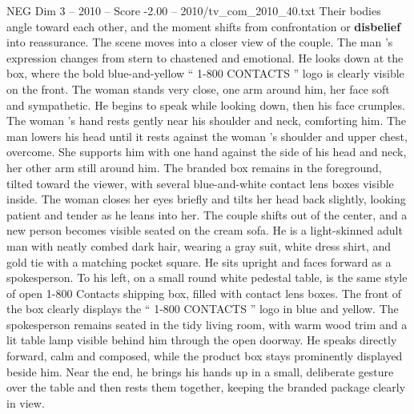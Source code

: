 \begin{textsample}{NEG Dim 3 – 2010 – Score -2.00 – 2010/tv\_com\_2010\_40.txt}
Their bodies angle toward each other, and the moment shifts from confrontation or \textbf{disbelief} into reassurance.
The scene moves into a closer view of the couple.
The man ’s expression changes from stern to chastened and emotional.
He looks down at the box, where the bold blue-and-yellow “ 1-800 CONTACTS ” logo is clearly visible on the front.
The woman stands very close, one arm around him, her face soft and sympathetic.
He begins to speak while looking down, then his face crumples.
The woman ’s hand rests gently near his shoulder and neck, comforting him.
The man lowers his head until it rests against the woman ’s shoulder and upper chest, overcome.
She supports him with one hand against the side of his head and neck, her other arm still around him.
The branded box remains in the foreground, tilted toward the viewer, with several blue-and-white contact lens boxes visible inside.
The woman closes her eyes briefly and tilts her head back slightly, looking patient and tender as he leans into her.
The couple shifts out of the center, and a new person becomes visible seated on the cream sofa.
He is a light-skinned adult man with neatly combed dark hair, wearing a gray suit, white dress shirt, and gold tie with a matching pocket square.
He sits upright and faces forward as a spokesperson.
To his left, on a small round white pedestal table, is the same style of open 1-800 Contacts shipping box, filled with contact lens boxes.
The front of the box clearly displays the “ 1-800 CONTACTS ” logo in blue and yellow.
The spokesperson remains seated in the tidy living room, with warm wood trim and a lit table lamp visible behind him through the open doorway.
He speaks directly forward, calm and composed, while the product box stays prominently displayed beside him.
Near the end, he brings his hands up in a small, deliberate gesture over the table and then rests them together, keeping the branded package clearly in view.

\end{textsample}
